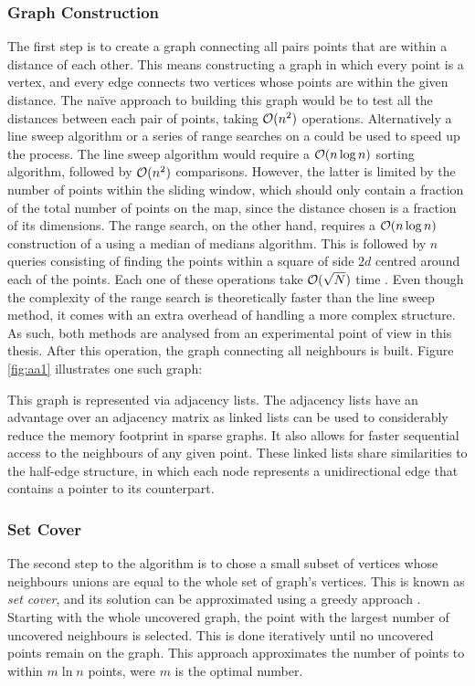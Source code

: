 \subsubsection*{Graph Construction}
The first step is to create a graph connecting all pairs points that are within a distance of each other. This means constructing a graph in which every point is a vertex, and every edge connects two vertices whose points are within the given distance. The naïve approach to building this graph would be to test all the distances between each pair of points, taking $\mathcal{O}(n^2)$ operations. Alternatively a line sweep algorithm or a series of range searches on a \kdtree could be used to speed up the process. The line sweep algorithm would require a $\mathcal{O}(n \log{n})$ sorting algorithm, followed by $\mathcal{O}(n^2)$ comparisons. However, the latter is limited by the number of points within the sliding window, which should only contain a fraction of the total number of points on the map, since the distance chosen is a fraction of its dimensions. The \kdtree range search, on the other hand, requires a $\mathcal{O}(n \log{n})$ construction of a \kdtree using a median of medians algorithm. This is followed by $n$ queries consisting of finding the points within a square of side $2d$ centred around each of the points. Each one of these operations take $\mathcal{O}(\sqrt{N})$ time \cite{kdrange}. Even though the complexity of the \kdtree range search is theoretically faster than the line sweep method, it comes with an extra overhead of handling a more complex structure. As such, both methods are analysed from an experimental point of view in this thesis. After this operation, the graph connecting all neighbours is built. Figure \ref{fig:aa1} illustrates one such graph:



This graph is represented via adjacency lists. The adjacency lists have an advantage over an adjacency matrix as linked lists can be used to considerably reduce the memory footprint in sparse graphs. It also allows for faster sequential access to the neighbours of any given point. These linked lists share similarities to the half-edge structure, in which each node represents a unidirectional edge that contains a pointer to its counterpart.

\subsubsection*{Set Cover}
The second step to the algorithm is to chose a small subset of vertices whose neighbours unions are equal to the whole set of graph's vertices. This is known as \emph{set cover}, and its solution can be approximated using a greedy approach \cite{greedyapprox}. Starting with the whole uncovered graph, the point with the largest number of uncovered neighbours is selected. This is done iteratively until no uncovered points remain on the graph. This approach approximates the number of points to within $m \ln{n}$ points, were $m$ is the optimal number.

